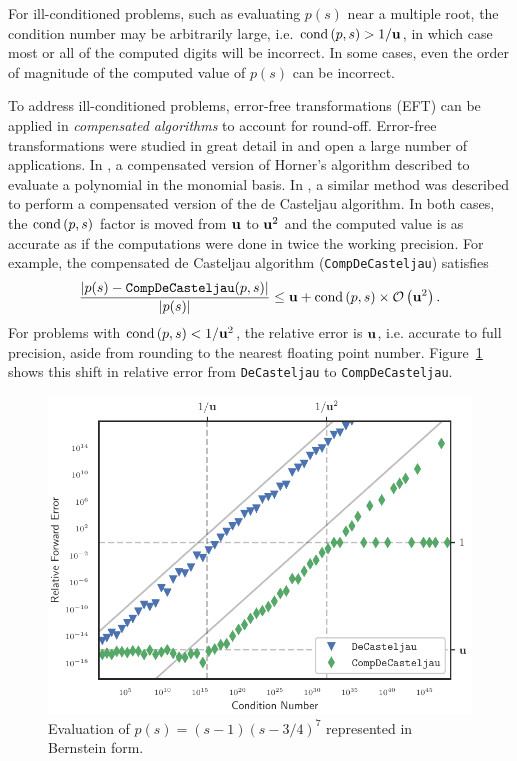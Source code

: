 For ill-conditioned problems, such as evaluating \(p(s)\) near a
multiple root, the condition number may be arbitrarily large, i.e.
\(\operatorname{cond}\left(p, s\right) > 1 / \mathbf{u}\), in
which case most or all of the computed digits will be incorrect.
In some cases, even the order of magnitude of the computed value
of \(p(s)\) can be incorrect.

To address ill-conditioned problems, error-free transformations (EFT) can
be applied in \emph{compensated algorithms} to account for round-off.
Error-free transformations were studied in great detail in \cite{Ogita2005}
and open a large number of applications.
In \cite{langlois_et_al:DSP:2006:442}, a compensated version of Horner's
algorithm described to evaluate a polynomial in the monomial basis.
In \cite{Jiang2010},
a similar method was described to perform a compensated version of the de
Casteljau algorithm. In both cases, the \(\operatorname{cond}\left(p, s\right)\) factor is moved
from \(\mathbf{u}\) to \(\mathbf{u}^2\) and the computed value is as accurate
as if the computations were done in twice the working precision. For example,
the compensated de Casteljau algorithm (\texttt{CompDeCasteljau}) satisfies
\begin{equation}\label{eq:de-casteljau-2-error}
  \frac{\left|p(s) - \mathtt{CompDeCasteljau}(p, s)\right|}{
    \left|p(s)\right|} \leq \mathbf{u} + \operatorname{cond}\left(p, s\right) \times
    \mathcal{O}\left(\mathbf{u}^2\right).
\end{equation}
For problems with \(\operatorname{cond}\left(p, s\right) < 1 / \mathbf{u}^2\), the relative error
is \(\mathbf{u}\), i.e. accurate to full precision, aside from rounding to the
nearest floating point number. Figure~\ref{fig:jlcs-10} shows this shift
in relative error from \texttt{DeCasteljau} to \texttt{CompDeCasteljau}.

\begin{figure}
  \includegraphics{../images/k-compensated/jlcs10_plot.pdf}
  \centering
  \captionsetup{width=.75\linewidth}
  \caption{Evaluation of \(p(s) = (s - 1)\left(s - 3/4\right)^7\)
    represented in Bernstein form.}
  \label{fig:jlcs-10}
\end{figure}


